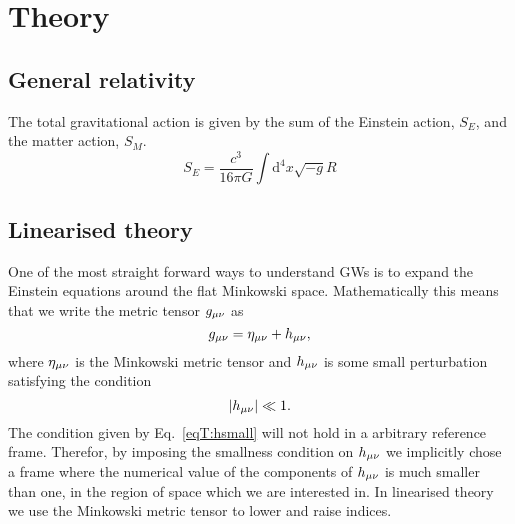 

\chapter{Theory}


\section{General relativity}
The total gravitational action is given by the sum of the 
Einstein action, $S_E$, and the matter action, $S_M$.
\begin{equation}
S_E = \frac{c^3}{16 \pi G} \int \mathrm{d}^4 x \sqrt{-g} R
\end{equation}


\section{Linearised theory}
One of the most straight forward ways to understand 
GWs is to expand the Einstein equations around the 
flat Minkowski space. Mathematically this means that we write the
metric tensor $g_{\mu\nu}$ as
\begin{equation} \label{eqT:metric}
g_{\mu\nu} = \eta_{\mu\nu} + h_{\mu\nu},
\end{equation}
where $\eta_{\mu\nu}$ is the Minkowski metric tensor and $h_{\mu\nu}$
is some small perturbation satisfying the condition
\begin{equation} \label{eqT:hsmall}
|h_{\mu\nu}|  \ll 1.
\end{equation}
The condition given by Eq.~\ref{eqT:hsmall} will not hold in a arbitrary 
reference frame. Therefor, by imposing the smallness condition on $h_{\mu\nu}$
we implicitly chose a frame where the numerical value of the components of $h_{\mu\nu}$ is much smaller than one,
in the region of space which we are interested in. In linearised theory we use the Minkowski metric tensor
to lower and raise indices. 

